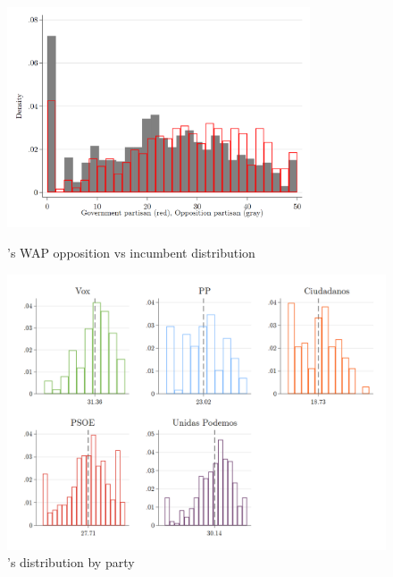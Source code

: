 \documentclass[a4paper, svgnames]{article}
\newcommand{\citeposs}[1]{\citeauthor{#1}'s \citeyearpar{#1}}
\begin{document}
\begin{figure}[H]
	\centering
	\caption{\citeposs{Wagner2021} WAP opposition vs incumbent distribution}
	\includegraphics[width=0.8\textwidth]{Figures/AP_index_by_partisanship_wagner.png}
	\label{fig:WAP_oppo_incumb}
	
\end{figure}

\begin{figure}[H]
	\centering
	\caption{\citeposs{Wagner2021} distribution by party}
	\includegraphics[width=\textwidth]{Figures/AP_index_by_party_id_wagner.png}
\end{figure}
\end{document}

